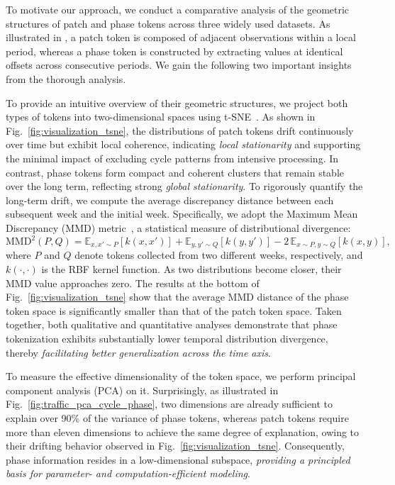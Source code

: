 To motivate our approach, we conduct a comparative analysis of the geometric structures of patch and phase tokens across three widely used datasets. 
As illustrated in , a patch token is composed of adjacent observations within a local period, whereas a phase token is constructed by extracting values at identical offsets across consecutive periods. We gain the following two important insights from the thorough analysis. 


To provide an intuitive overview of their geometric structures, we project both types of tokens into two-dimensional spaces using t-SNE~\citep{tsne2008}.
As shown in Fig.~\ref{fig:visualization_tsne}, the distributions of patch tokens drift continuously over time but exhibit local coherence, indicating \emph{local stationarity} and supporting the minimal impact of excluding cycle patterns from intensive processing. In contrast, phase tokens form compact and coherent clusters that remain stable over the long term, reflecting strong \emph{global stationarity}. To rigorously quantify the long-term drift, we compute the average discrepancy distance between each subsequent week and the initial week. Specifically, we adopt the Maximum Mean Discrepancy (MMD) metric~\citep{ouyang2021mmd}, a statistical measure of distributional divergence:
\begin{equation}
\mathrm{MMD}^2(P, Q) 
= \mathbb{E}_{x,x' \sim P}[k(x,x')] 
+ \mathbb{E}_{y,y' \sim Q}[k(y,y')] 
- 2\,\mathbb{E}_{x \sim P, y \sim Q}[k(x,y)],
\end{equation}
where \(P\) and \(Q\) denote tokens collected from two different weeks, respectively, and \(k(\cdot,\cdot)\) is the RBF kernel function. As two distributions become closer, their MMD value approaches zero. The results at the bottom of Fig.~\ref{fig:visualization_tsne} show that the average MMD distance of the phase token space is significantly smaller than that of the patch token space. Taken together, both qualitative and quantitative analyses demonstrate that phase tokenization exhibits substantially lower temporal distribution divergence, thereby \emph{facilitating better generalization across the time axis}.

To measure the effective dimensionality of the token space, we perform principal component analysis (PCA) on it. Surprisingly, as illustrated in Fig.~\ref{fig:traffic_pca_cycle_phase}, two dimensions are already sufficient to explain over 90\% of the variance of phase tokens, whereas patch tokens require more than eleven dimensions to achieve the same degree of explanation, owing to their drifting behavior observed in Fig.~\ref{fig:visualization_tsne}. Consequently, phase information resides in a low-dimensional subspace, \emph{providing a principled basis for parameter- and computation-efficient modeling}.

